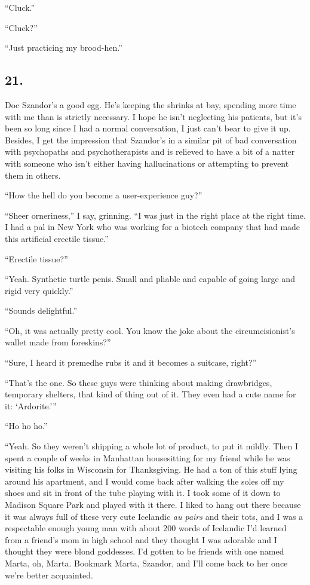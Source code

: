 “Cluck.”

“Cluck?”

“Just practicing my brood-hen.”

\subsection{21.}

Doc Szandor’s a good egg. He’s keeping the shrinks at bay, spending
more time with me than is strictly necessary. I hope he isn’t
neglecting his patients, but it’s been so long since I had a normal
conversation, I just can’t bear to give it up. Besides, I get the
impression that Szandor’s in a similar pit of bad conversation with
psychopaths and psychotherapists and is relieved to have a bit of a
natter with someone who isn’t either having hallucinations or
attempting to prevent them in others.

“How the hell do you become a user-experience guy?”

“Sheer orneriness,” I say, grinning. “I was just in the right place
at the right time. I had a pal in New York who was working for a
biotech company that had made this artificial erectile tissue.”

“Erectile tissue?”

“Yeah. Synthetic turtle penis. Small and pliable and capable of
going large and rigid very quickly.”

“Sounds delightful.”

“Oh, it was actually pretty cool. You know the joke about the
circumcisionist’s wallet made from foreskins?”

“Sure, I heard it premed{\dash}he rubs it and it becomes a suitcase,
right?”

“That’s the one. So these guys were thinking about making
drawbridges, temporary shelters, that kind of thing out of it. They
even had a cute name for it: ‘Ardorite.’”

“Ho ho ho.”

“Yeah. So they weren’t shipping a whole lot of product, to put it
mildly. Then I spent a couple of weeks in Manhattan housesitting
for my friend while he was visiting his folks in Wisconsin for
Thanksgiving. He had a ton of this stuff lying around his
apartment, and I would come back after walking the soles off my
shoes and sit in front of the tube playing with it. I took some of
it down to Madison Square Park and played with it there. I liked to
hang out there because it was always full of these very cute
Icelandic \emph{au pairs} and their tots, and I was a respectable
enough young man with about 200 words of Icelandic I’d learned from
a friend’s mom in high school and they thought I was adorable and I
thought they were blond goddesses. I’d gotten to be friends with
one named Marta, oh, Marta. Bookmark Marta, Szandor, and I’ll come
back to her once we’re better acquainted.

